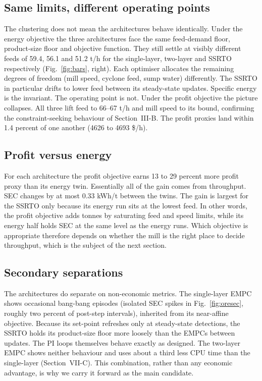 \documentclass[conference]{IEEEtran}
\begin{document}
\subsection{Same limits, different operating points}

The clustering does not mean the architectures behave identically. Under
the energy objective the three architectures face the same feed-demand
floor, product-size floor and objective function. They still settle at
visibly different feeds of 59.4, 56.1 and 51.2 t/h for the single-layer,
two-layer and SSRTO respectively (Fig.~\ref{fig:bars}, right). Each
optimiser allocates the remaining degrees of freedom (mill speed, cyclone
feed, sump water) differently. The SSRTO in particular drifts to
lower feed between its steady-state updates. Specific energy is the
invariant. The operating point is not. Under the profit objective the
picture collapses. All three lift feed to 66--67 t/h and mill speed to
its bound, confirming the constraint-seeking behaviour of Section~III-B.
The profit proxies land within 1.4 percent of one another (4626 to 4693
\$/h).

\subsection{Profit versus energy}

For each architecture the profit objective earns 13 to 29 percent more
profit proxy than its energy twin. Essentially all of the gain comes from
throughput. SEC changes by at most 0.33 kWh/t between the twins. The gain is largest
for the SSRTO only because its energy run sits at the lowest feed. In
other words, the profit objective adds tonnes by saturating feed and
speed limits, while its energy half holds SEC at the same level as the
energy runs. Which objective is appropriate therefore depends on whether
the mill is the right place to decide throughput, which is the subject
of the next section.

\subsection{Secondary separations}

The architectures do separate on non-economic metrics. The single-layer
EMPC shows occasional bang-bang episodes (isolated SEC spikes in
Fig.~\ref{fig:oresec}, roughly two percent of post-step intervals),
inherited from its near-affine objective. Because its set-point refreshes only
at steady-state detections, the SSRTO holds its product-size floor more
loosely than the EMPCs between updates. The PI loops themselves behave
exactly as designed. The two-layer EMPC shows neither behaviour and uses
about a third less CPU time than the single-layer (Section~VII-C). This
combination, rather than any economic advantage, is why we carry it
forward as the main candidate.
\end{document}
